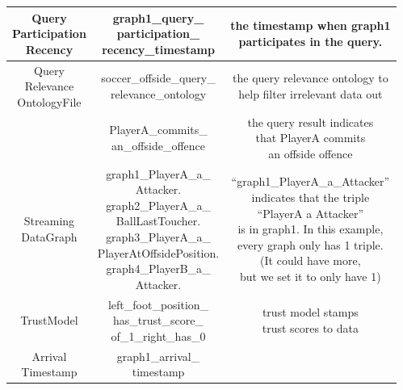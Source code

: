 \begin{center}
\begin{longtable}{|c||c||c|}
	\makecell{Query\\Participation\\Recency} & \makecell{graph1\_query\_\\participation\_\\recency\_timestamp} & \makecell[l]{the timestamp when graph1 \\participates in the query.} \\ \hline
	\makecell{Query\\Relevance\\OntologyFile} & \makecell{soccer\_offside\_query\_\\relevance\_ontology} & \makecell[l]{the query relevance ontology to \\help filter irrelevant data out} \\ \hline
	\makecell{QueryResult} & \makecell{PlayerA\_commits\_\\an\_offside\_offence} & \makecell[l]{the query result indicates \\that PlayerA commits \\an offside offence} \\ \hline
	\makecell{Streaming\\DataGraph} & \makecell{graph1\_PlayerA\_a\_\\Attacker.\\graph2\_PlayerA\_a\_\\BallLastToucher.\\graph3\_PlayerA\_a\_\\PlayerAtOffsidePosition.\\graph4\_PlayerB\_a\_\\Attacker.} & \makecell[l]{``graph1\_PlayerA\_a\_Attacker'' \\indicates that the triple \\``PlayerA a Attacker''\\ is in graph1. In this example, \\every graph only has 1 triple. \\(It could have more, \\but we set it to only have 1)} \\ \hline
	TrustModel & \makecell{left\_foot\_position\_\\has\_trust\_score\_\\of\_1\_right\_has\_0} & \makecell[l]{trust model stamps \\trust scores to data} \\ \hline
	\makecell{Arrival\\Timestamp} & \makecell{graph1\_arrival\_\\timestamp} & \makecell[l]{the arrival timestamp of graph1} \\ \hline

\end{longtable}
\end{center}
